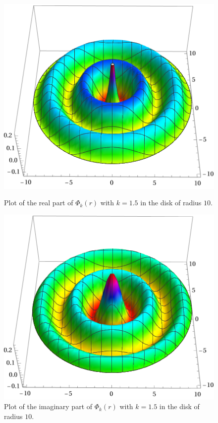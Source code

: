 \begin{figure}[H]
    \centering
    \begin{minipage}{.5\textwidth}
        \centering
        \includegraphics[width=\linewidth]{Images/Bessel/hankel_re.png}
        \captionsetup{width=0.9\linewidth} %
        \caption{Plot of the real part of \(\Phi_k(r)\) with \(k=1.5\) in the disk of radius \(10\).}
        \label{hankel_function_re}
    \end{minipage}%
    \begin{minipage}{.5\textwidth}
        \centering
        \includegraphics[width=\linewidth]{Images/Bessel/hankel_im.png}
        \captionsetup{width=0.9\linewidth} %
        \caption{Plot of the imaginary part of \(\Phi_k(r)\) with \(k=1.5\) in the disk of radius \(10\).}
        \label{hankel_function_im}
    \end{minipage}
\end{figure}